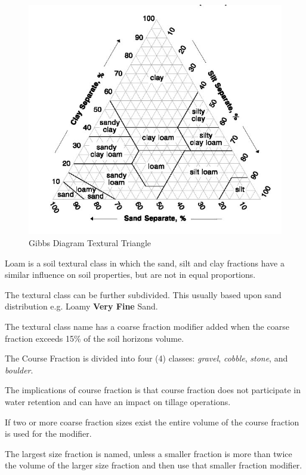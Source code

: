 \documentclass[a5paper]{book}
\begin{document}
\begin{figure}
    \centering
    \includegraphics{images/TexturalTriangle.jpg}
    \caption{Gibbs Diagram Textural Triangle}
    \label{fig:TexturalTriangle}
\end{figure}
    
Loam is a soil textural class in which the sand, silt and clay fractions have a similar influence on soil properties, but are not in equal proportions.
    
The textural class can be further subdivided. This usually based upon sand distribution e.g. Loamy \textbf{Very Fine} Sand.
    
The textural class name has a coarse fraction modifier added when the coarse fraction exceeds 15\% of the soil horizons volume.
    
The Course Fraction is divided into four (4) classes: \emph{gravel}, \emph{cobble}, \emph{stone}, and \emph{boulder}.
    
The implications of course fraction is that course fraction does not participate in water retention and can have an impact on tillage operations.
    
If two or more coarse fraction sizes exist the entire volume of the course fraction is used for the modifier.
    
The largest size fraction is named, unless a smaller fraction is more than twice the volume of the larger size fraction and then use that smaller fraction modifier.
    
\end{document}
